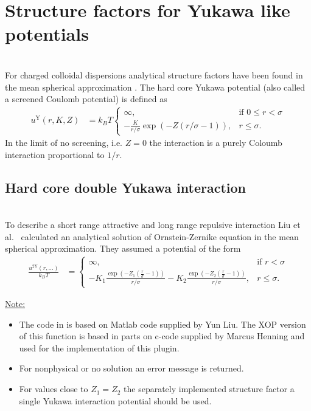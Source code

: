 \clearpage
\section{Structure factors for Yukawa like potentials}~\\
\label{sect:SQ4Yukawa}
For charged colloidal dispersions analytical structure factors have been found in the mean spherical approximation \cite{Hayter1981,Hansen1982,Liu2005}. The hard core Yukawa potential (also called a screened Coulomb potential) is defined as
\begin{align}
u^\mathrm{Y}(r,K,Z) &= k_BT \begin{cases}
                             \infty, & \mbox{if } 0\leq r < \sigma \\
                             -\frac{K}{r/\sigma}\exp(-Z (r/\sigma-1)), & r\leq \sigma.
                            \end{cases}
\end{align}
In the limit of no screening, i.e. $Z=0$ the interaction is a purely Coloumb interaction proportional to $1/r$.  

\subsection{Hard core double Yukawa interaction}~\\
\label{sect:SQ4doubleYukawa}
To describe a short range attractive and long range repulsive interaction Liu et al.\ \cite{Liu2005} calculated an analytical solution of Ornstein-Zernike equation in the mean spherical approximation. They assumed a potential of the form
\begin{align}\label{eq:SQ2Ypotential}
\frac{u^\mathrm{2Y}(r,\ldots)}{k_BT} &= \begin{cases}
                             \infty, & \mbox{if }  r < \sigma \\
                             -K_1\frac{\exp\left(-Z_1 \left(\frac{r}{\sigma}-1\right)\right)}{r/\sigma} -K_2\frac{\exp\left(-Z_2 \left(\frac{r}{\sigma}-1\right)\right)}{r/\sigma}, & r\leq \sigma.
                            \end{cases}
\end{align}

\noindent\underline{Note:}
\begin{itemize}
  \item The code in \SASfit is based on Matlab code supplied by Yun Liu. The XOP version of this function is based in parts on c-code supplied by Marcus Henning and used for the implementation of this plugin.
  \item For nonphysical or no solution an error message is returned.
  \item For values close to $Z_1=Z_2$ the separately implemented structure factor a single Yukawa interaction potential should be used.
\end{itemize} 